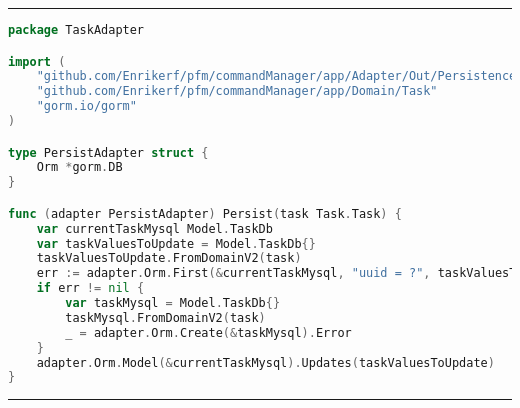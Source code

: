 
\phantom{blank}
\vspace{5mm}
\hrule
\begin{lstlisting}[language=Go,caption={SaveAdapter.go},breaklines=true,label={lst:SaveAdapter}]
package TaskAdapter

import (
	"github.com/Enrikerf/pfm/commandManager/app/Adapter/Out/Persistence/Model"
	"github.com/Enrikerf/pfm/commandManager/app/Domain/Task"
	"gorm.io/gorm"
)

type PersistAdapter struct {
	Orm *gorm.DB
}

func (adapter PersistAdapter) Persist(task Task.Task) {
	var currentTaskMysql Model.TaskDb
	var taskValuesToUpdate = Model.TaskDb{}
	taskValuesToUpdate.FromDomainV2(task)
	err := adapter.Orm.First(&currentTaskMysql, "uuid = ?", taskValuesToUpdate.Uuid).Error
	if err != nil {
		var taskMysql = Model.TaskDb{}
		taskMysql.FromDomainV2(task)
		_ = adapter.Orm.Create(&taskMysql).Error
	}
	adapter.Orm.Model(&currentTaskMysql).Updates(taskValuesToUpdate)
}


\end{lstlisting}
\hrule